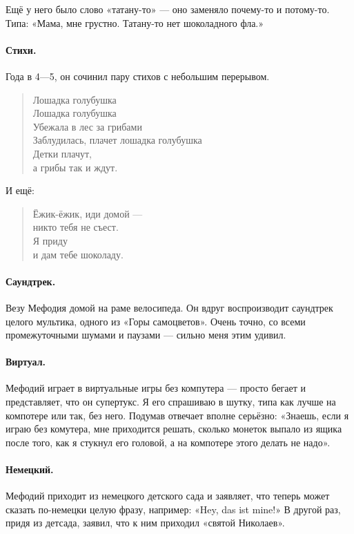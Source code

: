 \documentclass{book}
\begin{document}
Ещё у него было слово «татану-то» --- оно заменяло почему-то и потому-то.
Типа: «Мама, мне грустно. Татану-то нет шоколадного фла.»

\paragraph{Стихи.} Года в 4---5, он сочинил пару стихов с небольшим перерывом.
\begin{verse}
Лошадка голубушка\\
Лошадка голубушка\\
Убежала в лес за грибами\\
Заблудилась, плачет лошадка голубушка\\
Детки плачут,\\
а грибы так и ждут.
\end{verse}
И ещё:
\begin{verse}
Ёжик-ёжик, иди домой ---\\
\quad никто тебя не съест.\\
Я приду\\
\quad и дам тебе шоколаду.
\end{verse}

\paragraph{Саундтрек.} 
Везу Мефодия домой на раме велосипеда.
Он вдруг воспроизводит саундтрек целого мультика, одного из «Горы самоцветов».
Очень точно, со всеми промежуточными шумами и паузами --- сильно меня этим удивил.

\paragraph{Виртуал.} Мефодий играет в виртуальные игры без компутера --- просто бегает и представляет, что он супертукс.
Я его спрашиваю в шутку, типа как лучше на компотере или так, без него.
Подумав отвечает вполне серьёзно: «Знаешь, если я играю без комутера, мне приходится решать, сколько монеток выпало из ящика после того, как я стукнул его головой, а на компотере этого делать не надо».

\paragraph{Немецкий.} Мефодий приходит из немецкого детского сада
и заявляет, что теперь может сказать по-немецки целую фразу,
например: «Hey, das ist mine!»
В другой раз, придя из детсада, заявил, что к ним приходил «святой Николаев».
\end{document}
